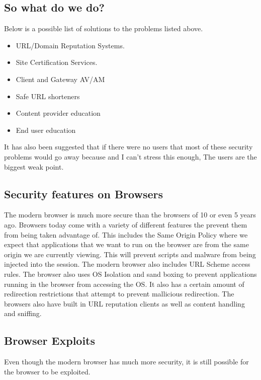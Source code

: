 \documentclass[letterpaper, onecolumn,10pt]{IEEEtran}
\begin{document}
                \subsection{So what do we do?}
                Below is a possible list of solutions to the problems listed above.
                \begin{itemize}
                    \item URL/Domain Reputation Systems.
                    \item Site Certification Services.
                    \item Client and Gateway AV/AM
                    \item Safe URL shorteners
                    \item Content provider education
                    \item End user education
                \end{itemize}
                It has also been suggested that if there were no users that most of these security problems would go away because and I can't stress this enough, The users are the biggest weak point.\\
                
                \subsection{Security features on Browsers} 
                The modern browser is much more secure than the browsers of 10 or even 5 years ago. Browsers today come with a variety of different features the prevent them from being taken advantage of. This includes the Same Origin Policy where we expect that applications that we want to run on the browser are from the same origin we are currently viewing. This will prevent scripts and malware from being injected into the session. The modern browser also includes URL Scheme access rules. The browser also uses OS Isolation and sand boxing to prevent applications running in the browser from accessing the OS. It also has a certain amount of redirection restrictions that attempt to prevent mallicious redirection. The browsers also have built in URL reputation clients as well as content handling and sniffing.\\
                
                \subsection{Browser Exploits}
                Even though the modern browser has much more security, it is still possible for the browser to be exploited.
                
\end{document}
